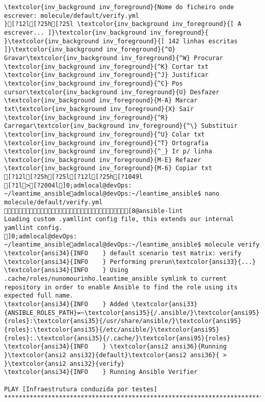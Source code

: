 \documentclass{scrartcl}
\begin{document}
\begin{Verbatim}
\textcolor{inv_background inv_foreground}{Nome do ficheiro onde escrever: molecule/default/verify.yml                                                                               }[?12l[?25h[?25l \textcolor{inv_background inv_foreground}{[ A escrever... ]}\textcolor{inv_background inv_foreground}{          }\textcolor{inv_background inv_foreground}{[ 142 linhas escritas ]}\textcolor{inv_background inv_foreground}{^O} Gravar\textcolor{inv_background inv_foreground}{^W} Procurar      \textcolor{inv_background inv_foreground}{^K} Cortar txt    \textcolor{inv_background inv_foreground}{^J} Justificar    \textcolor{inv_background inv_foreground}{^C} Pos cursor\textcolor{inv_background inv_foreground}{U} Desfazer     \textcolor{inv_background inv_foreground}{M-A} Marcar txt\textcolor{inv_background inv_foreground}{X} Sair    \textcolor{inv_background inv_foreground}{^R} Carregar\textcolor{inv_background inv_foreground}{^\} Substituir    \textcolor{inv_background inv_foreground}{^U} Colar txt     \textcolor{inv_background inv_foreground}{^T} Ortografia    \textcolor{inv_background inv_foreground}{^_} Ir p/ linha   \textcolor{inv_background inv_foreground}{M-E} Refazer      \textcolor{inv_background inv_foreground}{M-6} Copiar txt
[?12l[?25h[?25l[?12l[?25h[?1049l
[?1l>[?2004l]0;admlocal@devOps: ~/leantime_ansibleadmlocal@devOps:~/leantime_ansible$ nano molecule/default/verify.yml [8@ansible-lint
Loading custom .yamllint config file, this extends our internal yamllint config.
]0;admlocal@devOps: ~/leantime_ansibleadmlocal@devOps:~/leantime_ansible$ molecule verify
\textcolor{ansi34}{INFO    } default scenario test matrix: verify
\textcolor{ansi34}{INFO    } Performing prerun\textcolor{ansi33}{...}
\textcolor{ansi34}{INFO    } Using .cache/roles/nunomourinho.leantime_ansible symlink to current repository in order to enable Ansible to find the role using its expected full name.
\textcolor{ansi34}{INFO    } Added \textcolor{ansi33}{ANSIBLE_ROLES_PATH}=~\textcolor{ansi35}{/.ansible/}\textcolor{ansi95}{roles}:\textcolor{ansi35}{/usr/share/ansible/}\textcolor{ansi95}{roles}:\textcolor{ansi35}{/etc/ansible/}\textcolor{ansi95}{roles}:.\textcolor{ansi35}{/.cache/}\textcolor{ansi95}{roles}
\textcolor{ansi34}{INFO    } \textcolor{ansi2 ansi36}{Running }\textcolor{ansi2 ansi32}{default}\textcolor{ansi2 ansi36}{ > }\textcolor{ansi2 ansi32}{verify}
\textcolor{ansi34}{INFO    } Running Ansible Verifier

PLAY [Infraestrutura conduzida por testes] ***********************************************************************************************


\end{Verbatim}
\end{document}
